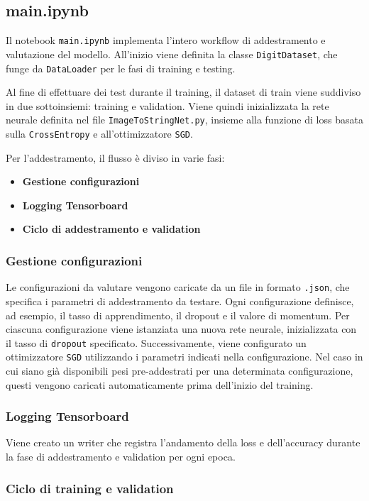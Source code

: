 \subsection*{main.ipynb}
Il notebook \texttt{main.ipynb} implementa l'intero workflow di addestramento e valutazione del modello.
All'inizio viene definita la classe \texttt{DigitDataset}, che funge da \texttt{DataLoader} per le fasi di training e testing.

Al fine di effettuare dei test durante il training, il dataset di train viene suddiviso in due sottoinsiemi: training e validation.
Viene quindi inizializzata la rete neurale definita nel file \texttt{ImageToStringNet.py}, insieme alla funzione di loss basata sulla \texttt{CrossEntropy} e all'ottimizzatore \texttt{SGD}.

Per l'addestramento, il flusso è diviso in varie fasi:
\begin{itemize}
    \item \textbf{Gestione configurazioni}
    \item \textbf{Logging Tensorboard}
    \item \textbf{Ciclo di addestramento e validation}
 \end{itemize}

\subsubsection*{Gestione configurazioni}
Le configurazioni da valutare vengono caricate da un file in formato \texttt{.json}, che specifica i parametri di addestramento da testare.  
Ogni configurazione definisce, ad esempio, il tasso di apprendimento, il dropout e il valore di momentum. Per ciascuna configurazione viene istanziata una nuova rete neurale, inizializzata con il tasso di \texttt{dropout} specificato.  
Successivamente, viene configurato un ottimizzatore \texttt{SGD} utilizzando i parametri indicati nella configurazione.  
Nel caso in cui siano già disponibili pesi pre-addestrati per una determinata configurazione, questi vengono caricati automaticamente prima dell'inizio del training.

\subsubsection*{Logging Tensorboard}
Viene creato un writer che registra l'andamento della loss e dell'accuracy durante la fase di addestramento e validation per ogni epoca.

\subsubsection*{Ciclo di training e validation}

